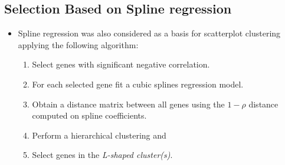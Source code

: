 \subsection{Selection Based on Spline regression}
\begin{itemize}
\item Spline regression \cite{racine} was also considered as a basis for scatterplot clustering applying the following algorithm:

\begin {enumerate}
\item Select genes with significant negative correlation.
\item For each selected gene fit a cubic splines regression model.
\item Obtain a distance matrix between all genes using the $1-\rho$ distance computed on spline coefficients.
\item Perform a hierarchical clustering and 
\item Select genes in the \textit{L-shaped cluster(s)}.
\end{enumerate}
\end{itemize}
